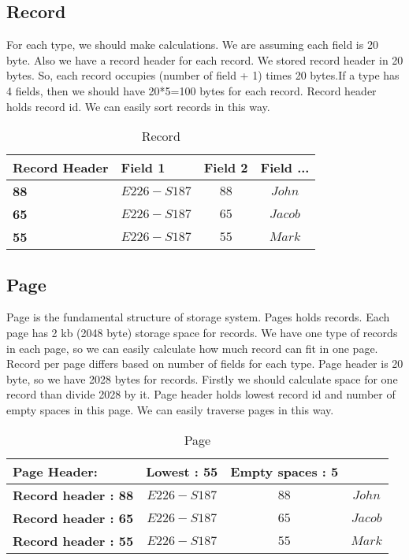 \documentclass{article}
\begin{document}
\subsection{Record}
For each type, we should make calculations. We are assuming each field is 20 byte. Also we have a record header for each record. We stored record header in 20 bytes. So, each record occupies (number of field + 1) times 20 bytes.If a type has 4 fields, then we should have 20*5=100 bytes for each record. Record header holds record id. We can easily sort records in this way.
\begin{table}[H]
\centering
\begin{tabular}{|l|c|c|c}
\hline
\textbf{Record Header}   & \multicolumn{1}{l|}{\textbf{Field 1}} & \multicolumn{1}{l|}{\textbf{Field 2}} & \multicolumn{1}{l|}{\textbf{Field ...}} \\ \hline
\textbf{88} & $E226 − S187$         & $88$          & $John$           \\ \hline
\textbf{65} & $E226 − S187$         & $65$          & $Jacob$           \\ \hline
\textbf{55} & $E226 − S187$         & $55$          & $Mark$           \\ \hline
\end{tabular}
\label{tab:ex}
\caption{Record}
\end{table}
\subsection{Page}
Page is the fundamental structure of storage system. Pages holds records. Each page has 2 kb (2048 byte) storage space for records. We have one type of records in each page, so we can easily calculate how much record can fit in one page. Record per page differs based on number of fields for each type. Page header is 20 byte, so we have 2028 bytes for records. Firstly we should calculate space for one record than divide 2028 by it. Page header holds lowest record id and number of empty spaces in this page. We can easily traverse pages in this way.
\begin{table}[H]
\centering
\begin{tabular}{|l|c|c|c}
\hline
\textbf{Page Header:}   & \multicolumn{1}{l|}{\textbf{Lowest : 55}} & \multicolumn{1}{l|}{\textbf{Empty spaces : 5}} & \multicolumn{1}{l|}{\textbf{}} \\ \hline
\textbf{Record header : 88} & $E226 − S187$         & $88$          & $John$           \\ \hline
\textbf{Record header : 65} & $E226 − S187$         & $65$          & $Jacob$           \\ \hline
\textbf{Record header : 55} & $E226 − S187$         & $55$          & $Mark$           \\ \hline
\end{tabular}
\label{tab:ex}
\caption{Page}
\end{table}
\end{document}
